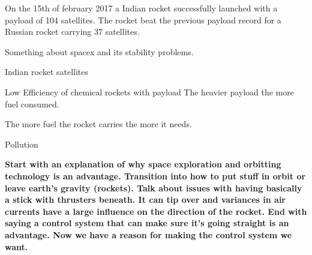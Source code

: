 On the 15th of february 2017 a Indian rocket successfully launched with a payload of 104 satellites. The rocket beat the previous payload record for a Russian rocket carrying 37 satellites.  






Something about spacex and its stability problems.

Indian rocket satellites 

Low Efficiency of chemical rockets with payload    
The heavier payload the more fuel consumed.

The more fuel the rocket carries the more it needs. 

Pollution 


\textbf{Start with an explanation of why space exploration and orbitting technology is an advantage. Transition into how to put stuff in orbit or leave earth's gravity (rockets). Talk about issues with having basically a stick with thrusters beneath. It can tip over and variances in air currents have a large influence on the direction of the rocket. End with saying a control system that can make sure it's going straight is an advantage. Now we have a reason for making the control system we want.}


